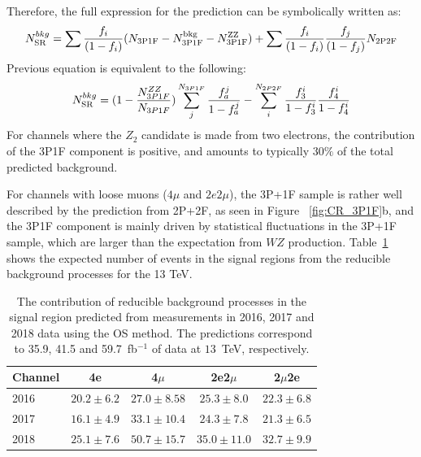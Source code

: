 Therefore, the
full expression for the prediction can be symbolically written as:
%
\begin{equation} 
\label{eq:PredictionSR}
N^{bkg}_{\rm SR} = \sum \frac{f_{i}}{(1-f_{i})} (N_{\rm 3P1F} - N^{\rm
bkg}_{\rm 3P1F} - N^{\rm ZZ}_{\rm 3P1F})
+ \sum \frac{f_{i}}{(1-f_{i})} \frac{f_{j}}{(1-f_{j})}N_{\rm 2P2F} \end{equation}
Previous equation is equivalent to the following:
\begin{equation}
\label{eq:PredictionSR2}
N^{bkg}_{\rm SR}= (1-\frac{N_{3P1F}^{ZZ}}{N_{3P1F}})\sum_j^{N_{3P1F}}\frac{f_a^j}{1-f_a^j} - \sum_i^{N_{2P2F}}\frac{f_3^i}{1-f_3^i}\frac{f_4^i}{1-f_4^i}
\end{equation}
For channels where the $Z_2$ candidate is made from two electrons, 
the contribution of the 3P1F component is 
positive, and amounts to typically $30 \%$ of the total predicted background.

For channels with loose muons ($4\mu$ and $2e2\mu$), the 3P+1F sample is rather well described by
the prediction from 2P+2F, as seen in Figure ~\ref{fig:CR_3P1F}b, and the
3P1F component is mainly driven by statistical fluctuations in the 3P+1F sample,
which are larger than the expectation from $WZ$ production.
Table~\ref{tab:reducibleMethodA} shows the expected number of
events in the signal regions from the reducible background processes for the 13 TeV. 
\begin{table}[h]
\begin{center}
     \begin{tabular}{| l | c | c | c | c |} \hline
Channel & 4e               & 4$\mu$          & 2e2$\mu$        & 2$\mu$2e        \\ \hline \hline
2016    & $ 20.2 \pm 6.2 $ & $27.0 \pm 8.58$ & $25.3 \pm 8.0$  & $22.3 \pm 6.8$  \\
2017    & $ 16.1 \pm 4.9 $ & $33.1 \pm 10.4$ & $24.3 \pm 7.8$  & $21.3 \pm 6.5$  \\
2018    & $ 25.1 \pm 7.6 $ & $50.7 \pm 15.7$ & $35.0 \pm 11.0$ & $32.7 \pm 9.9$ \\ \hline
        \end{tabular}
\end{center}
    \caption{ The contribution of reducible background
    processes in the signal region predicted from measurements in 2016, 2017 and 2018 data
    using the OS method. The predictions correspond to 35.9, 41.5 and 59.7~fb$^{-1}$ of data at $13$~TeV, respectively.}
     \label{tab:reducibleMethodA}
\end{table}




